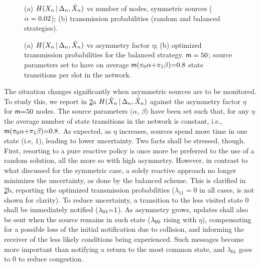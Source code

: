 \begin{figure}
    \hspace*{.1em}
    \caption{(a) $H(X_n\, | \,\Delta_n,\hat{X}_n)$ vs number of nodes, symmetric sources ($\alpha=0.02$); (b) transmission probabilities (random and balanced strategies).}
    \label{fig:symmetric}
    \vspace{-1em}
\end{figure}


\begin{figure}
    \hspace*{.1em}
    \caption{(a) $H(X_n\, | \,\Delta_n,\hat{X}_n)$ vs asymmetry factor $\eta$; (b) optimized transmission probabilities for the balanced strategy. $\mathsf m=50$; source parameters set to have on average $\mathsf m(\pi_0\alpha {+} \pi_1\beta){=}0.8$ state transitions per slot in the network.}
    \label{fig:asymm}
    \vspace{-1em}
\end{figure}

The situation changes significantly when asymmetric sources are to be monitored. To study this, we report in \figr\ref*{fig:asymm}a $H(\hat{X}_n\, | \,\Delta_n,\hat{X}_n)$ against the asymmetry factor $\eta$ for $\mathsf m{=}50$ nodes. The source parameters $(\alpha$, $\beta)$ have been set such that, for any $\eta$ the average number of state transitions in the network is constant, i.e., $\mathsf m(\pi_0\alpha {+} \pi_1\beta){=}0.8$. As expected, as $\eta$ increases, sources spend more time in one state (i.e, $1$), leading to lower uncertainty. Two facts shall be stressed, though. First, resorting to a pure reactive policy is once more be preferred to the use of a random solution, all the more so with high asymmetry. However, in contrast to what discussed for the symmetric case, a solely reactive approach no longer minimizes the uncertainty, as done by the balanced scheme. This is clarified in \figr\ref{fig:asymm}b, reporting the optimized transmission probabilities ($\lambda_{11}{=}0$ in all cases, is not shown for clarity). To reduce uncertainty, a transition to the less visited state $0$ shall be immediately notified ($\lambda_{01}{=}1$). As asymmetry grows, updates shall also be sent when the source remains in such state ($\lambda_{00}$ rising with $\eta$), compensating for a possible loss of the initial notification due to collision, and informing the receiver of the less likely conditions being experienced. Such messages become more important than notifying a return to the most common state, and $\lambda_{01}$ goes to $0$ to reduce congestion.





